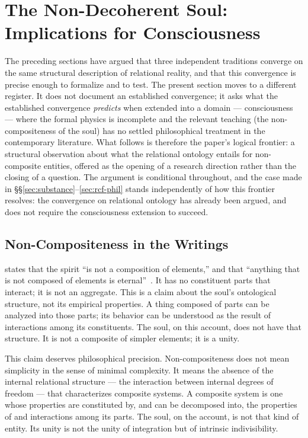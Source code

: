 
\section{The Non-Decoherent Soul: Implications for Consciousness}
\label{sec:soul}

The preceding sections have argued that three independent traditions
converge on the same structural description of relational reality, and
that this convergence is precise enough to formalize and to test.
The present section moves to a different register.
It does not document an established convergence; it asks what the
established convergence \emph{predicts} when extended into a domain ---
consciousness --- where the formal physics is incomplete and the
relevant \bahai teaching (the non-compositeness of the soul) has no
settled philosophical treatment in the contemporary literature.
What follows is therefore the paper's logical frontier: a structural
observation about what the relational ontology entails for non-composite
entities, offered as the opening of a research direction rather than the
closing of a question.
The argument is conditional throughout, and the case made in
\S\S\ref{sec:substance}--\ref{sec:rcf-phil} stands independently of how
this frontier resolves: the convergence on relational ontology has
already been argued, and does not require the consciousness extension
to succeed.

\subsection{Non-Compositeness in the \bahai Writings}

\AbdulBaha states that the spirit ``is not a composition of elements,''
and that ``anything that is not composed of elements is
eternal''~\citep[Talk 85]{PUP}.
It has no constituent parts that interact; it is not an aggregate.
This is a claim about the soul's ontological structure, not its empirical properties.
A thing composed of parts can be analyzed into those parts; its behavior
can be understood as the result of interactions among its constituents.
The soul, on this account, does not have that structure.
It is not a composite of simpler elements; it is a unity.

This claim deserves philosophical precision.
Non-compositeness does not mean simplicity in the sense of minimal complexity.
It means the absence of the internal relational structure --- the interaction
between internal degrees of freedom --- that characterizes composite systems.
A composite system is one whose properties are constituted by, and can be
decomposed into, the properties of and interactions among its parts.
The soul, on the \bahai account, is not that kind of entity.
Its unity is not the unity of integration but of intrinsic indivisibility.

